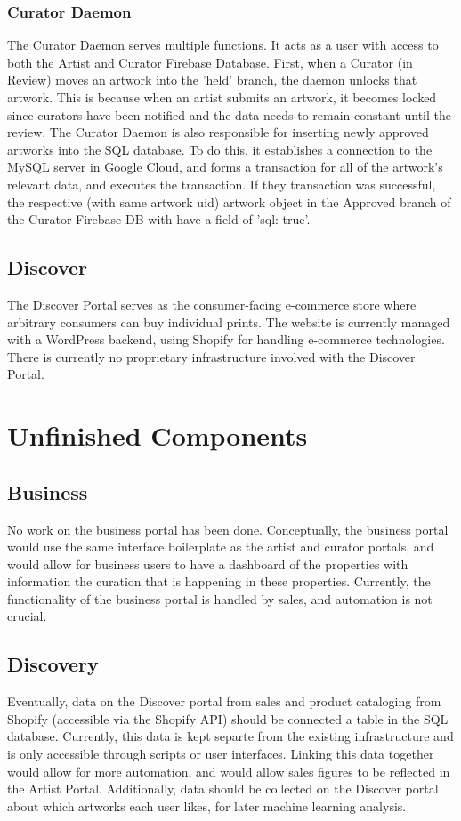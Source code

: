 \documentclass[fontsize=12pt]{scrartcl} %
\begin{document}
\subsubsection{Curator Daemon}
The Curator Daemon serves multiple functions. It acts as a user with access to both the Artist and Curator Firebase Database. First, when a Curator (in Review) moves an artwork into the 'held' branch, the daemon unlocks that artwork. This is because when an artist submits an artwork, it becomes locked since curators have been notified and the data needs to remain constant until the review.
The Curator Daemon is also responsible for inserting newly approved artworks into the SQL database. To do this, it establishes a connection to the MySQL server in Google Cloud, and forms a transaction for all of the artwork's relevant data, and executes the transaction. If they transaction was successful, the respective (with same artwork uid) artwork object in the Approved branch of the Curator Firebase DB with have a field of 'sql: true'.

\subsection{Discover}
The Discover Portal serves as the consumer-facing e-commerce store where arbitrary consumers can buy individual prints. The website is currently managed with a WordPress backend, using Shopify for handling e-commerce technologies. There is currently no proprietary infrastructure involved with the Discover Portal.

\section{Unfinished Components}
\subsection{Business}
No work on the business portal has been done. Conceptually, the business portal would use the same interface boilerplate as the artist and curator portals, and would allow for business users to have a dashboard of the properties with information the curation that is happening in these properties. Currently, the functionality of the business portal is handled by sales, and automation is not crucial.

\subsection{Discovery}
Eventually, data on the Discover portal from sales and product cataloging from Shopify (accessible via the Shopify API) should be connected a table in the SQL database. Currently, this data is kept separte from the existing infrastructure and is only accessible through scripts or user interfaces. Linking this data together would allow for more automation, and would allow sales figures to be reflected in the Artist Portal. Additionally, data should be collected on the Discover portal about which artworks each user likes, for later machine learning analysis.
\end{document}

